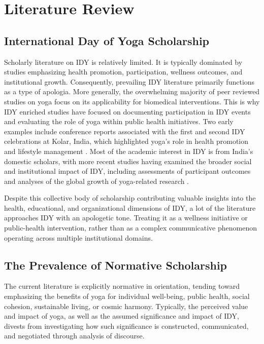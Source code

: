 \documentclass[11pt]{article}
\begin{document}
\section{Literature Review}


\subsection{International Day of Yoga Scholarship}

Scholarly literature on IDY is relatively limited. It is typically dominated by studies emphasizing health promotion, participation, wellness outcomes, and institutional growth. Consequently, prevailing IDY literature primarily functions as a type of apologia. More generally, the overwhelming majority of peer reviewed studies on yoga focus on its applicability for biomedical interventions. This is why IDY enriched studies have focused on documenting participation in IDY events and evaluating the role of yoga within public health initiatives. Two early examples include conference reports associated with the first and second IDY celebrations at Kolar, India, which highlighted yoga's role in health promotion and lifestyle management \cite{bhattacharyya2015,patil2016}. Most of the academic interest in IDY is from India's domestic scholars, with more recent studies having examined the broader social and institutional impact of IDY, including assessments of participant outcomes and analyses of the global growth of yoga-related research \cite{manjunath2023,mohan2024,prasad2025}.

Despite this collective body of scholarship contributing valuable insights into the health, educational, and organizational dimensions of IDY, a lot of the literature approaches IDY with an apologetic tone. Treating it as a wellness initiative or public-health intervention, rather than as a complex communicative phenomenon operating across multiple institutional domains.


\subsection{The Prevalence of Normative Scholarship}

The current literature is explicitly normative in orientation, tending toward emphasizing the benefits of yoga for individual well-being, public health, social cohesion, sustainable living, or cosmic harmony. Typically, the perceived value and impact of yoga, as well as the assumed significance and impact of IDY, divests from investigating how such significance is constructed, communicated, and negotiated through analysis of discourse.
\end{document}
